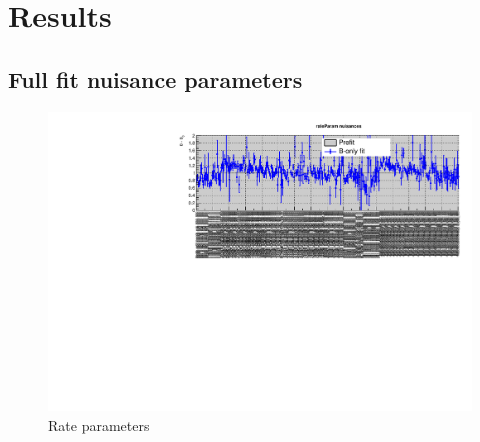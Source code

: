 \section{Results}
\label{app:results}

%
%

%
%

\subsection{Full fit nuisance parameters}
\label{app:nuispost}

\begin{figure}[h!]
  \centering
  \caption{Rate parameters}
  \includegraphics[width=1.\linewidth]{figures/results/36invfb_preapproval/postfit/nuis/Rates_nuisances}
\end{figure}

